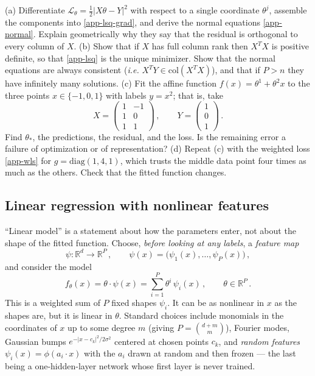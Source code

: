 \documentclass[11pt]{article}
\newcommand{\R}{\mathbb{R}}
\newcommand{\CL}{{\mathcal L}}
\begin{document}
\begin{exercise}
\label{ex:app-lsq}
(a) Differentiate $\CL_\theta = \frac{1}{2}|X\theta-Y|^2$ with respect to a single coordinate $\theta^j$, assemble the components into \eqref{app-lsq-grad}, and derive the normal equations \eqref{app-normal}. Explain geometrically why they say that the residual is orthogonal to every column of $X$.
(b) Show that if $X$ has full column rank then $X^TX$ is positive definite, so that \eqref{app-lsq} is the unique minimizer. Show that the normal equations are always consistent (\emph{i.e.} $X^TY\in\mathrm{col}(X^TX)$), and that if $P>n$ they have infinitely many solutions.
(c) Fit the affine function $f(x) = \theta^1 + \theta^2 x$ to the three points $x\in\{-1,0,1\}$ with labels $y=x^2$; that is, take
%
\begin{equation*}
    X = \begin{pmatrix} 1 & -1 \\ 1 & 0 \\ 1 & 1\end{pmatrix}\,,\qquad Y = \begin{pmatrix} 1 \\ 0 \\ 1\end{pmatrix}\,.
\end{equation*}
%
Find $\theta_*$, the predictions, the residual, and the loss. Is the remaining error a failure of optimization or of representation?
(d) Repeat (c) with the weighted loss \eqref{app-wls} for $g = \mathrm{diag}(1,4,1)$, which trusts the middle data point four times as much as the others. Check that the fitted function changes.
\end{exercise}

\subsection{Linear regression with nonlinear features}
\label{app:features}

``Linear model'' is a statement about how the parameters enter, not about the shape of the fitted function. Choose, \emph{before looking at any labels}, a \emph{feature map}
%
\begin{equation}
    \psi:\R^d\to \R^P\,,\qquad \psi(x) = \big(\psi_1(x),\ldots,\psi_P(x)\big)\,,
\end{equation}
%
and consider the model
%
\begin{equation}
    f_\theta(x) = \theta\cdot\psi(x) = \sum_{i=1}^P \theta^i\,\psi_i(x)\,,\qquad \theta\in\R^P\,. \label{app-featmodel}
\end{equation}
%
This is a weighted sum of $P$ fixed shapes $\psi_i$. It can be as nonlinear in $x$ as the shapes are, but it is linear in $\theta$. Standard choices include monomials in the coordinates of $x$ up to some degree $m$ (giving $P=\binom{d+m}{m}$), Fourier modes, Gaussian bumps $e^{-|x-c_k|^2/2\sigma^2}$ centered at chosen points $c_k$, and \emph{random features} $\psi_i(x) = \phi(a_i\cdot x)$ with the $a_i$ drawn at random and then frozen --- the last being a one-hidden-layer network whose first layer is never trained.
\end{document}
